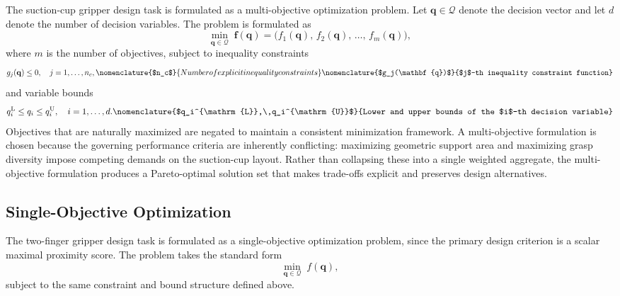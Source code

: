 The suction-cup gripper design task is formulated as a multi-objective optimization problem. Let $\mathbf{q} \in \mathcal{Q}$
  denote the decision vector and let $d$
denote the number of decision variables. The problem is formulated as
\begin{equation}
    \min_{\mathbf{q} \in \mathcal{Q}}\;
    \mathbf{f}(\mathbf{q}) = \bigl(f_1(\mathbf{q}),\, f_2(\mathbf{q}),\, \dots,\, f_m(\mathbf{q})\bigr),
\end{equation}
where $m$
is the number of objectives, subject to inequality constraints
\begin{equation}
    g_j(\mathbf{q}) \leq 0, \quad j = 1, \dots, n_c,
    \nomenclature{$n_c$}{Number of explicit inequality constraints}
    \nomenclature{$g_j(\mathbf{q})$}{$j$-th inequality constraint function}
\end{equation}
and variable bounds
\begin{equation}
    q_i^{\mathrm{L}} \leq q_i \leq q_i^{\mathrm{U}}, \quad i = 1, \dots, d.
    \nomenclature{$q_i^{\mathrm{L}},\,q_i^{\mathrm{U}}$}{Lower and upper bounds of the $i$-th decision variable}
\end{equation}
Objectives that are naturally maximized are negated to maintain a consistent minimization framework. A multi-objective formulation is chosen because
the governing performance criteria are inherently conflicting: maximizing geometric support area and maximizing grasp diversity impose competing
demands on the suction-cup layout. Rather than collapsing these into a single weighted aggregate, the multi-objective formulation produces a
Pareto-optimal solution set that makes trade-offs explicit and preserves design alternatives.

\subsection{Single-Objective Optimization}
\label{subsec:methodology_soo}

The two-finger gripper design task is formulated as a single-objective optimization problem, since the primary design criterion is a scalar maximal
proximity score. The problem takes the standard form
\begin{equation}
    \min_{\mathbf{q} \in \mathcal{Q}}\; f(\mathbf{q}),
\end{equation}
subject to the same constraint and bound structure defined above.

